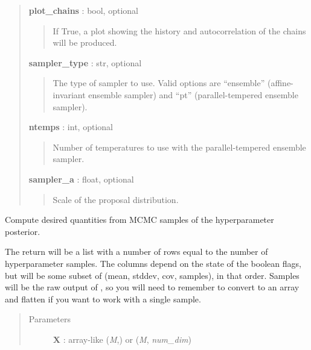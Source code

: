 \documentclass[letterpaper,10pt,english]{sphinxmanual}
\begin{document}
\begin{fulllineitems}
\begin{fulllineitems}
\begin{quote}
\begin{description}
\textbf{plot\_chains} : bool, optional
\begin{quote}

If True, a plot showing the history and autocorrelation of the
chains will be produced.
\end{quote}

\textbf{sampler\_type} : str, optional
\begin{quote}

The type of sampler to use. Valid options are ``ensemble'' (affine-
invariant ensemble sampler) and ``pt'' (parallel-tempered ensemble
sampler).
\end{quote}

\textbf{ntemps} : int, optional
\begin{quote}

Number of temperatures to use with the parallel-tempered ensemble
sampler.
\end{quote}

\textbf{sampler\_a} : float, optional
\begin{quote}

Scale of the proposal distribution.
\end{quote}

\end{description}\end{quote}

\end{fulllineitems}


\begin{fulllineitems}
\label{gptools:gptools.gaussian_process.GaussianProcess.compute_from_MCMC}
Compute desired quantities from MCMC samples of the hyperparameter posterior.

The return will be a list with a number of rows equal to the number of
hyperparameter samples. The columns depend on the state of the boolean
flags, but will be some subset of (mean, stddev, cov, samples), in that
order. Samples will be the raw output of {\hyperref[gptools:gptools.gaussian_process.GaussianProcess.draw_sample]{}}, so you
will need to remember to convert to an array and flatten if you want to
work with a single sample.
\begin{quote}\begin{description}
\item[{Parameters}] \leavevmode
\textbf{X} : array-like (\emph{M},) or (\emph{M}, \emph{num\_dim})
\begin{quote}


\end{quote}
\end{description}
\end{quote}
\end{fulllineitems}
\end{fulllineitems}
\end{document}
